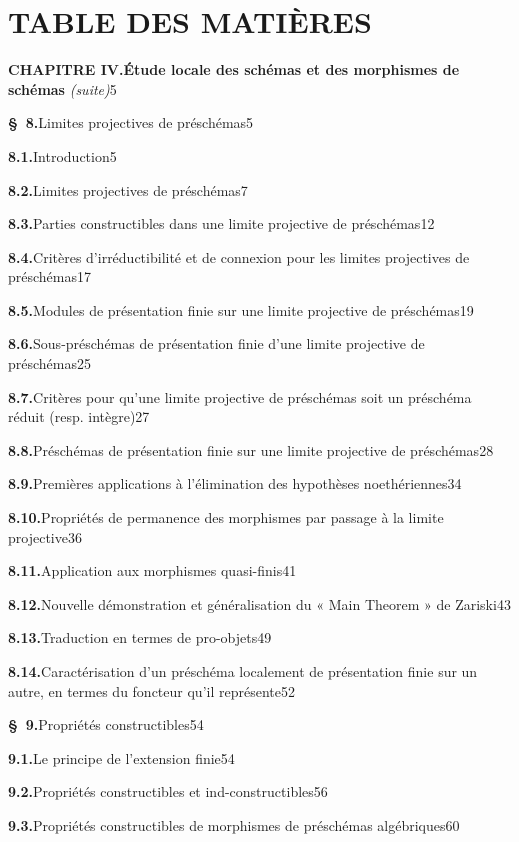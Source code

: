 {}
\section*{TABLE DES MATIÈRES}

\begingroup
\small
\setlength{\parindent}{0pt}
\setlength{\parskip}{1.5pt}
\newcommand{\EGAIVthreeContentsLine}[3]{\textbf{#1}\quad #2\unskip\nobreak\hspace{0.4em}\nobreak\dotfill\nobreak\mbox{#3}\par}

\EGAIVthreeContentsLine{CHAPITRE IV.}{\textbf{Étude locale des schémas et des morphismes de schémas} \emph{(suite)}}{5}
\EGAIVthreeContentsLine{\S~8.}{Limites projectives de préschémas}{5}
\EGAIVthreeContentsLine{8.1.}{Introduction}{5}
\EGAIVthreeContentsLine{8.2.}{Limites projectives de préschémas}{7}
\EGAIVthreeContentsLine{8.3.}{Parties constructibles dans une limite projective de préschémas}{12}
\EGAIVthreeContentsLine{8.4.}{Critères d'irréductibilité et de connexion pour les limites projectives de préschémas}{17}
\EGAIVthreeContentsLine{8.5.}{Modules de présentation finie sur une limite projective de préschémas}{19}
\EGAIVthreeContentsLine{8.6.}{Sous-préschémas de présentation finie d'une limite projective de préschémas}{25}
\EGAIVthreeContentsLine{8.7.}{Critères pour qu'une limite projective de préschémas soit un préschéma réduit (resp. intègre)}{27}
\EGAIVthreeContentsLine{8.8.}{Préschémas de présentation finie sur une limite projective de préschémas}{28}
\EGAIVthreeContentsLine{8.9.}{Premières applications à l'élimination des hypothèses noethériennes}{34}
\EGAIVthreeContentsLine{8.10.}{Propriétés de permanence des morphismes par passage à la limite projective}{36}
\EGAIVthreeContentsLine{8.11.}{Application aux morphismes quasi-finis}{41}
\EGAIVthreeContentsLine{8.12.}{Nouvelle démonstration et généralisation du « Main Theorem » de Zariski}{43}
\EGAIVthreeContentsLine{8.13.}{Traduction en termes de pro-objets}{49}
\EGAIVthreeContentsLine{8.14.}{Caractérisation d'un préschéma localement de présentation finie sur un autre, en termes du foncteur qu'il représente}{52}

\EGAIVthreeContentsLine{\S~9.}{Propriétés constructibles}{54}
\EGAIVthreeContentsLine{9.1.}{Le principe de l'extension finie}{54}
\EGAIVthreeContentsLine{9.2.}{Propriétés constructibles et ind-constructibles}{56}
\EGAIVthreeContentsLine{9.3.}{Propriétés constructibles de morphismes de préschémas algébriques}{60}

\clearpage
